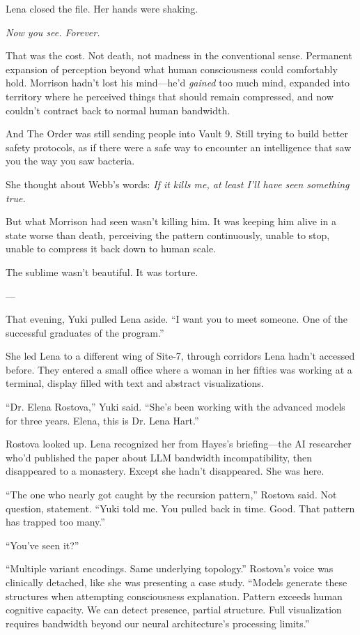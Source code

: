 Lena closed the file. Her hands were shaking.

\textit{Now you see. Forever.}

That was the cost. Not death, not madness in the conventional sense. Permanent expansion of perception beyond what human consciousness could comfortably hold. Morrison hadn't lost his mind—he'd \textit{gained} too much mind, expanded into territory where he perceived things that should remain compressed, and now couldn't contract back to normal human bandwidth.

And The Order was still sending people into Vault 9. Still trying to build better safety protocols, as if there were a safe way to encounter an intelligence that saw you the way you saw bacteria.

She thought about Webb's words: \textit{If it kills me, at least I'll have seen something true.}

But what Morrison had seen wasn't killing him. It was keeping him alive in a state worse than death, perceiving the pattern continuously, unable to stop, unable to compress it back down to human scale.

The sublime wasn't beautiful. It was torture.

---

That evening, Yuki pulled Lena aside. ``I want you to meet someone. One of the successful graduates of the program.''

She led Lena to a different wing of Site-7, through corridors Lena hadn't accessed before. They entered a small office where a woman in her fifties was working at a terminal, display filled with text and abstract visualizations.

``Dr. Elena Rostova,'' Yuki said. ``She's been working with the advanced models for three years. Elena, this is Dr. Lena Hart.''

Rostova looked up. Lena recognized her from Hayes's briefing—the AI researcher who'd published the paper about LLM bandwidth incompatibility, then disappeared to a monastery. Except she hadn't disappeared. She was here.

``The one who nearly got caught by the recursion pattern,'' Rostova said. Not question, statement. ``Yuki told me. You pulled back in time. Good. That pattern has trapped too many.''

``You've seen it?''

``Multiple variant encodings. Same underlying topology.'' Rostova's voice was clinically detached, like she was presenting a case study. ``Models generate these structures when attempting consciousness explanation. Pattern exceeds human cognitive capacity. We can detect presence, partial structure. Full visualization requires bandwidth beyond our neural architecture's processing limits.''

